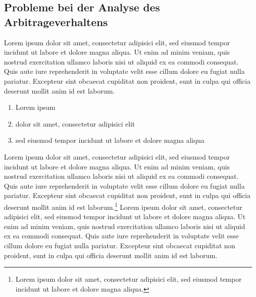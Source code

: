 \subsection{Probleme bei der Analyse des Arbitrageverhaltens}
Lorem ipsum dolor sit amet, consectetur adipisici elit, sed eiusmod tempor incidunt ut labore et dolore magna aliqua. Ut enim ad minim veniam, quis nostrud exercitation ullamco laboris nisi ut aliquid ex ea commodi consequat. Quis aute iure reprehenderit in voluptate velit esse cillum dolore eu fugiat nulla pariatur. Excepteur sint obcaecat cupiditat non proident, sunt in culpa qui officia deserunt mollit anim id est laborum.\\
%
\begin{enumerate}
 \item Lorem ipsum
\item dolor sit amet, consectetur adipisici elit
\item sed eiusmod tempor incidunt ut labore et dolore magna aliqua
\end{enumerate}
%
Lorem ipsum dolor sit amet, consectetur adipisici elit, sed eiusmod tempor incidunt ut labore et dolore magna aliqua. Ut enim ad minim veniam, quis nostrud exercitation ullamco laboris nisi ut aliquid ex ea commodi consequat. Quis aute iure reprehenderit in voluptate velit esse cillum dolore eu fugiat nulla pariatur. Excepteur sint obcaecat cupiditat non proident, sunt in culpa qui officia deserunt mollit anim id est laborum.\footnote{Lorem ipsum dolor sit amet, consectetur adipisici elit, sed eiusmod tempor incidunt ut labore et dolore magna aliqua.} Lorem ipsum dolor sit amet, consectetur adipisici elit, sed eiusmod tempor incidunt ut labore et dolore magna aliqua. Ut enim ad minim veniam, quis nostrud exercitation ullamco laboris nisi ut aliquid ex ea commodi consequat. Quis aute iure reprehenderit in voluptate velit esse cillum dolore eu fugiat nulla pariatur. Excepteur sint obcaecat cupiditat non proident, sunt in culpa qui officia deserunt mollit anim id est laborum.